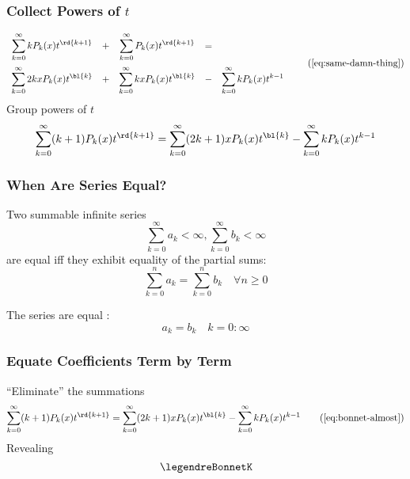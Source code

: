 \begin{frame}\frametitle{Collect Powers of $t$}
\begin{equation}
	\begin{array}{ccccc c}
		\displaystyle\sum_{k=0}^{\infty}{k P_{k}(x)t^{\rd{k+1}}}
			&+&
		\displaystyle\sum_{k=0}^{\infty}{P_{k}(x)t^{\rd{k+1}}} 
			&=& \\[15pt]
		\displaystyle\sum_{k=0}^{\infty}{2kx P_{k}(x)t^{\bl{k}}}
			&+&
		\displaystyle\sum_{k=0}^{\infty}{kxP_{k}(x)t^{\bl{k}}} 
			&-& 
		\displaystyle\sum_{k=0}^{\infty}{k P_{k}(x)t^{k-1}}
	\end{array}
\tag{\ref{eq:same-damn-thing}}
\end{equation}	
Group powers of $t$
\begin{equation}
	\displaystyle\sum_{k=0}^{\infty}(k+1)P_{k}(x)t^{\rd{k+1}} 
		= \displaystyle\sum_{k=0}^{\infty}(2k+1) x P_{k}(x)t^{\bl{k}} 
		- \displaystyle\sum_{k=0}^{\infty}{k P_{k}(x)t^{k-1}}
\label{eq:bonnet-almost}
\end{equation}
\end{frame}

\begin{frame}\frametitle{When Are Series Equal?}
\begin{definition}
Two summable infinite series
	$$ \sum_{k=0}^{\infty} a_{k} < \infty, \sum_{k=0}^{\infty} b_{k} < \infty$$
	are equal iff they exhibit equality of the partial sums:
\begin{equation*}
	\sum_{k=0}^{n} a_{k} = \sum_{k=0}^{n} b_{k} \quad \forall n \ge 0
\end{equation*}
\end{definition}
The series are equal :
$$ a_{k} =  b_{k} \quad k=0\colon \infty$$
\end{frame}

\begin{frame}\frametitle{Equate Coefficients Term by Term}
``Eliminate'' the summations
\begin{equation}
	\displaystyle\sum_{k=0}^{\infty}(k+1)P_{k}(x)t^{\rd{k+1}} 
		= \displaystyle\sum_{k=0}^{\infty}(2k+1) x P_{k}(x)t^{\bl{k}} 
		- \displaystyle\sum_{k=0}^{\infty}{k P_{k}(x)t^{k-1}}
\tag{\ref{eq:bonnet-almost}}
\end{equation}
Revealing 
\begin{equation}
	\legendreBonnetK
\end{equation}		
\end{frame}


\endinput  %
